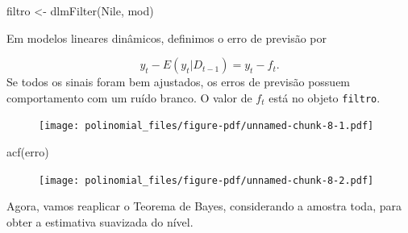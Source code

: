 \documentclass[
  letterpaper,
  DIV=11,
  numbers=noendperiod]{scrreprt}
\newenvironment{Shaded}{\begin{snugshade}}{\end{snugshade}}
\newcommand{\AttributeTok}[1]{\textcolor[rgb]{0.40,0.45,0.13}{#1}}
\newcommand{\DecValTok}[1]{\textcolor[rgb]{0.68,0.00,0.00}{#1}}
\newcommand{\FunctionTok}[1]{\textcolor[rgb]{0.28,0.35,0.67}{#1}}
\newcommand{\NormalTok}[1]{\textcolor[rgb]{0.00,0.23,0.31}{#1}}
\newcommand{\OtherTok}[1]{\textcolor[rgb]{0.00,0.23,0.31}{#1}}
\newcommand{\SpecialCharTok}[1]{\textcolor[rgb]{0.37,0.37,0.37}{#1}}
\newcommand{\StringTok}[1]{\textcolor[rgb]{0.13,0.47,0.30}{#1}}
\begin{document}
\begin{Shaded}
\begin{Highlighting}[]
\NormalTok{filtro }\OtherTok{\textless{}{-}} \FunctionTok{dlmFilter}\NormalTok{(Nile, mod)}
\end{Highlighting}
\end{Shaded}

Em modelos lineares dinâmicos, definimos o erro de previsão por

\[y_t-E(y_t|D_{t-1})=y_t-f_t.\] Se todos os sinais foram bem ajustados,
os erros de previsão possuem comportamento com um ruído branco. O valor
de \(f_t\) está no objeto \texttt{filtro}.

\begin{Shaded}
\end{Shaded}

\begin{figure}[H]

{\centering \texttt{[image: polinomial\_files/figure-pdf/unnamed-chunk-8-1.pdf]}

}

\end{figure}

\begin{Shaded}
\begin{Highlighting}[]
\FunctionTok{acf}\NormalTok{(erro)}
\end{Highlighting}
\end{Shaded}

\begin{figure}[H]

{\centering \texttt{[image: polinomial\_files/figure-pdf/unnamed-chunk-8-2.pdf]}

}

\end{figure}

Agora, vamos reaplicar o Teorema de Bayes, considerando a amostra toda,
para obter a estimativa suavizada do nível.

\begin{Shaded}
\end{Shaded}
\end{document}
